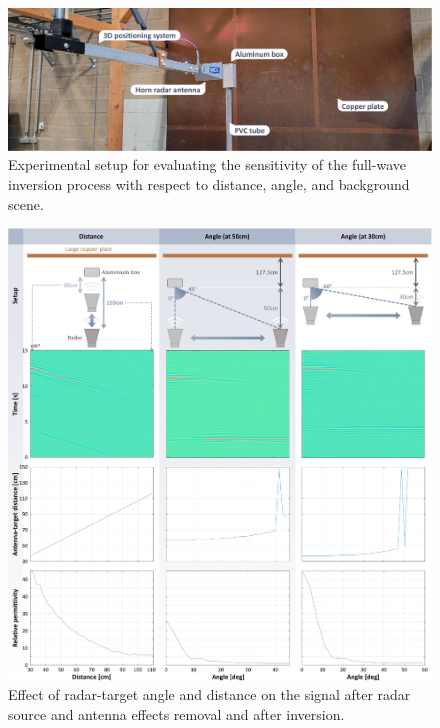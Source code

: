 \begin{figure}
    \centering
    \includegraphics[width=\linewidth]{Figures/RadarChallenges/Pipeline/horn-experimental-setup.pdf}
    \vspace{-12pt}
    \caption{Experimental setup for evaluating the sensitivity of the full-wave inversion process with respect to distance, angle, and background scene.}
    \label{fig:radar-challenges:radar-angle-distance-setup}
    \vspace{-14pt}
\end{figure}


\begin{figure}
    \centering
    \includegraphics[width=\linewidth]{Figures/RadarChallenges/Pipeline/effect-of-angle-distance.pdf}
    \vspace{-12pt}
    \caption{Effect of radar-target angle and distance on the signal after radar source and antenna effects removal and after inversion.}
    \label{fig:radar-challenges:radar-angle-distance}
    \vspace{-14pt}
\end{figure}

